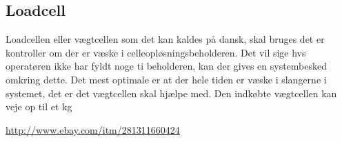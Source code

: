 \subsection{Loadcell}
Loadcellen eller vægtcellen som det kan kaldes på dansk, skal bruges det er kontroller om der er væske i celleopløsningsbeholderen. Det vil sige hvs operatøren ikke har fyldt noge ti beholderen, kan der gives en systembesked omkring dette. Det mest optimale er at der hele tiden er væske i slangerne i systemet, det er det vægtcellen skal hjælpe med. Den indkøbte vægtcellen kan veje op til et kg

\url{http://www.ebay.com/itm/281311660424}


